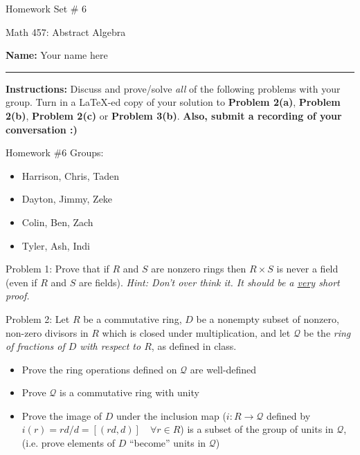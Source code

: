 \documentclass{article}
\theoremstyle{definition}
\begin{document}
\begin{center}
\Large{Homework Set \# 6}

\normalsize{Math 457: Abstract Algebra}

\vspace{0.2cm}

\hfill {\bf Name:} Your name here

\vspace{0.25cm}
\hrule
\end{center}

\vspace{0.3cm}



\noindent \textbf{Instructions:}  Discuss and prove/solve \emph{all} of the following problems with your group.  Turn in a \LaTeX-ed copy of your solution to \textbf{Problem 2(a)}, \textbf{Problem 2(b)}, \textbf{Problem 2(c)} or \textbf{Problem 3(b)}.   \textbf{Also, submit a recording of your conversation :)}  


\bigskip

\noindent Homework \#6 Groups: 
\begin{multicols}{2}
\begin{itemize}
    \item[(1)] Harrison, Chris, Taden
    \item[(2)] Dayton, Jimmy, Zeke
    \item[(3)] Colin, Ben, Zach
    \item[(4)] Tyler, Ash, Indi
\end{itemize}
\end{multicols}
\vspace{1cm}

\noindent Problem 1:   %
Prove that if $R$ and $S$ are nonzero rings then $R\times S$ is never a field (even if $R$ and $S$ are fields).  \emph{Hint: Don't over think it.  It should be a \underline{very} short proof.}

\vspace{1cm}

\noindent Problem 2:  %
Let $R$ be a commutative ring, $D$ be a nonempty subset of nonzero, non-zero divisors in $R$ which is closed under multiplication, and let $\mathcal{Q}$ be the \emph{ring of fractions of $D$ with respect to $R$}, as defined in class. 
 \begin{itemize}
     \item[(a)] Prove the ring operations defined on $\mathcal{Q}$ are well-defined
     \item[(b)] Prove $\mathcal{Q}$ is a commutative ring with unity
     \item[(c)] Prove the image of $D$ under the inclusion map ($i:R\rightarrow \mathcal{Q}$ defined by $i(r)=rd/d=[(rd,d)]\quad \forall r\in R$) is a subset of the group of units in $\mathcal{Q}$, (i.e. prove elements of $D$ ``become'' units in $\mathcal{Q}$)
\end{itemize}
\end{document}
